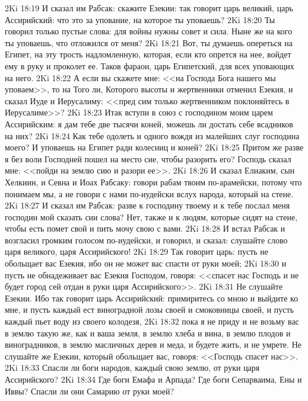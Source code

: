 \vs 2Ki 18:19 И сказал им Рабсак: скажите Езекии: так говорит царь великий, царь Ассирийский: что это за упование, на которое ты уповаешь?
\vs 2Ki 18:20 Ты говорил только пустые слова: для войны нужны совет и сила. Ныне же на кого ты уповаешь, что отложился от меня?
\vs 2Ki 18:21 Вот, ты думаешь опереться на Египет, на эту трость надломленную, которая, если кто опрется на нее, войдет ему в руку и проколет ее. Таков фараон, царь Египетский, для всех уповающих на него.
\vs 2Ki 18:22 А если вы скажете мне: <<на Господа Бога нашего мы уповаем>>, то на Того ли, Которого высоты и жертвенники отменил Езекия, и сказал Иуде и Иерусалиму: <<пред сим только жертвенником поклоняйтесь в Иерусалиме>>?
\vs 2Ki 18:23 Итак вступи в союз с господином моим царем Ассирийским: я дам тебе две тысячи коней, можешь ли достать себе всадников на них?
\vs 2Ki 18:24 Как тебе одолеть и одного вождя из малейших слуг господина моего? И уповаешь на Египет ради колесниц и коней?
\vs 2Ki 18:25 Притом же разве я без воли Господней пошел на место сие, чтобы разорить его? Господь сказал мне: <<пойди на землю сию и разори ее>>.
\vs 2Ki 18:26 И сказал Елиаким, сын Хелкиин, и Севна и Иоах Рабсаку: говори рабам твоим по-арамейски, потому что понимаем мы, а не говори с нами по-иудейски вслух народа, который на стене.
\vs 2Ki 18:27 И сказал им Рабсак: разве  к господину твоему и к тебе послал меня господин мой сказать сии слова? Нет, также и к людям, которые сидят на стене, чтобы есть помет свой и пить мочу свою с вами.
\vs 2Ki 18:28 И встал Рабсак и возгласил громким голосом по-иудейски, и говорил, и сказал: слушайте слово царя великого, царя Ассирийского!
\vs 2Ki 18:29 Так говорит царь: пусть не обольщает вас Езекия, ибо он не может вас спасти от руки моей;
\vs 2Ki 18:30 и пусть не обнадеживает вас Езекия Господом, говоря: <<спасет нас Господь и не будет город сей отдан в руки царя Ассирийского>>.
\vs 2Ki 18:31 Не слушайте Езекии. Ибо так говорит царь Ассирийский: примиритесь со мною и выйдите ко мне, и пусть каждый ест  виноградной лозы своей и смоковницы своей, и пусть каждый пьет воду из своего колодезя,
\vs 2Ki 18:32 пока я не приду и не возьму вас в землю такую же, как и ваша земля, в землю хлеба и вина, в землю плодов и виноградников, в землю масличных дерев и меда, и будете жить, и не умрете. Не слушайте же Езекии, который обольщает вас, говоря: <<Господь спасет нас>>.
\vs 2Ki 18:33 Спасли ли боги народов, каждый свою землю, от руки царя Ассирийского?
\vs 2Ki 18:34 Где боги Емафа и Арпада? Где боги Сепарваима, Ены и Иввы? Спасли ли они Самарию от руки моей?
